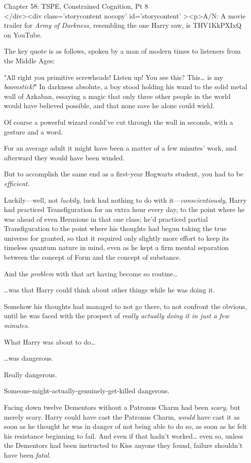
Chapter 58: TSPE, Constrained Cognition, Pt 8\\
</div><div  class='storycontent nocopy' id='storycontent' ><p>A/N: A movie 
trailer for \emph{Army of Darkness,} resembling the one Harry saw, is 
THV1KkPXIxQ on YouTube.

The key quote is as follows, spoken by a man of modern times to listeners from 
the Middle Ages:

"All right you primitive screwheads! Listen up! You see this? This{\ldots} is 
my \emph{boomstick!}"
\sbreak
In darkness absolute, a boy stood holding his wand to the solid metal wall of 
Azkaban, essaying a magic that only three other people in the world would have 
believed possible, and that none save he alone could wield.

Of course a powerful wizard could've cut through the wall in seconds, with a 
gesture and a word.

For an average adult it might have been a matter of a few minutes' work, and 
afterward they would have been winded.

But to accomplish the same end as a first-year Hogwarts student, you had to be 
\emph{efficient.}

Luckily---well, not \emph{luckily}, luck had nothing to do with 
it---\emph{conscientiously}, Harry had practiced Transfiguration for an extra 
hour every day, to the point where he was ahead of even Hermione in that one 
class; he'd practiced partial Transfiguration to the point where his thoughts 
had begun taking the true universe for granted, so that it required only 
slightly more effort to keep its timeless quantum nature in mind, even as he 
kept a firm mental separation between the concept of Form and the concept of 
substance.

And the \emph{problem} with that art having become so routine{\ldots}

{\ldots}was that Harry could think about other things while he was doing it.

Somehow his thoughts had managed to not go there, to not confront the obvious, 
until he was faced with the prospect of \emph{really actually doing it in just 
a few minutes}.

What Harry was about to do{\ldots}

{\ldots}was dangerous.

Really dangerous.

Someone-might-actually-genuinely-get-killed dangerous.

Facing down twelve Dementors without a Patronus Charm had been \emph{scary,} 
but merely scary. Harry could have cast the Patronus Charm, \emph{would} have 
cast it as soon as he thought he was in danger of not being able to do so, as 
soon as he felt his resistance beginning to fail. And even if that hadn't 
worked{\ldots} even so, unless the Dementors had been instructed to Kiss anyone 
they found, failure shouldn't have been \emph{fatal.}

